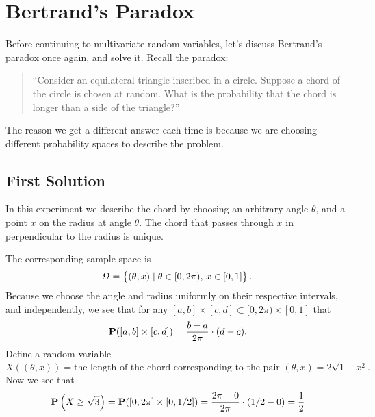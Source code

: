 \documentclass[11pt,a4paper]{article}
\begin{document}
  \newpage

  \section{Bertrand's Paradox}
  Before continuing to multivariate random variables, let's discuss Bertrand's
  paradox once again, and solve it. Recall the paradox:
  \begin{quote}
  ``Consider an equilateral triangle inscribed in a circle. 
    Suppose a chord of the circle is chosen at random. 
    What is the probability that the chord is longer than a side of the 
    triangle?''
  \end{quote}

  The reason we get a different answer
  each time is because we are choosing different probability
  spaces to describe the problem.
  \subsection{First Solution}
    In this experiment we describe the chord by choosing an arbitrary angle
    $\theta$, and a point $x$ on the radius at angle $\theta$. The chord
    that passes through $x$ in perpendicular to the radius is unique.
    \begin{center}
    \end{center}
    The corresponding sample space is
    \[
      \Omega = \set{(\theta, x) \mid \theta \in [0, 2 \pi),\, x \in [0,1]}.
    \]
    Because we choose the angle and radius uniformly on their respective
    intervals, and independently, we see that for any 
    $[a,b] \times [c,d] \subset [0, 2 \pi) \times [0,1]$ that
    \[
      \mathbf{P}([a,b] \times [c,d]) = \frac{b-a}{2 \pi} \cdot (d-c).
    \]
    Define a random variable
    \[
      X\left((\theta, x)\right) = \text{the length of the chord corresponding
      to the pair $(\theta, x)$} = 2 \sqrt{1 - x^2}.
    \]
    Now we see that
    \[
      \mathbf{P}\left(X \geq \sqrt{3}\right) = 
      \mathbf{P}([0,2 \pi] \times [0,1/2]) =
      \frac{2 \pi-0}{2 \pi} \cdot (1/2-0) =
      \frac{1}{2}
    \]
  
\end{document}
